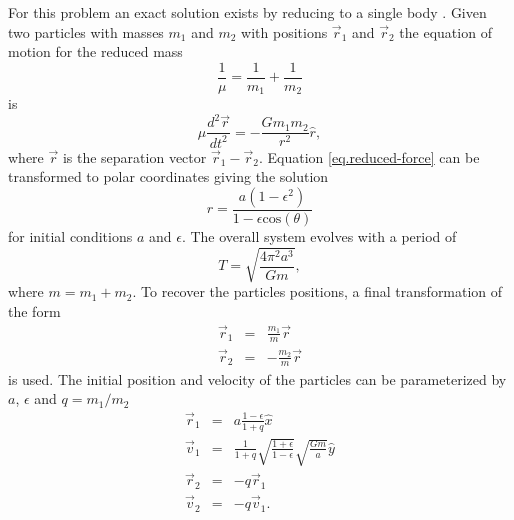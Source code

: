 For this problem an exact solution exists by reducing to a single body \citep{Landau1969}.
Given two particles with masses $m_1$ and $m_2$ with positions $\vec{r}_1$ and $\vec{r}_2$ the 
equation of motion for the reduced mass
\begin{equation}
	\frac{1}{\mu} = \frac{1}{m_1} + \frac{1}{m_2}
\end{equation}
is
\begin{equation}
	\mu\frac{d^2 \vec{r}}{dt^2} = -\frac{G m_1 m_2}{r^2}\hat{r},
    \label{eq.reduced-force}
\end{equation}
where $\vec{r}$ is the separation vector $\vec{r}_1 - \vec{r}_2$. Equation \ref{eq.reduced-force} 
can be transformed to polar coordinates giving the solution
\begin{equation}
	r = \frac{a(1-\epsilon^2)}{1-\epsilon \mathrm{cos}(\theta)}
\end{equation}
for initial conditions $a$ and $\epsilon$. The overall system evolves with a period of
\begin{equation}
    T = \sqrt{\frac{4\pi^2 a^3}{G m}},
\end{equation}
where $m=m_1 + m_2$. To recover the particles positions, a final transformation
of the form
\begin{equation}
	\begin{array}{rcl}
		\vec{r}_1 & = & \frac{m_1}{m}\vec{r}\\
    	\vec{r}_2 & = & -\frac{m_2}{m}\vec{r}
    \end{array}
\end{equation}
is used. The initial position and velocity of the particles can be parameterized by $a$,
$\epsilon$ and $q=m_1/m_2$
\begin{equation}
	\begin{array}{rcl}
    	\vec{r}_1 & = & a\frac{1-\epsilon}{1+q} \hat{x}\\
        \vec{v}_1 & = & \frac{1}{1+q}\sqrt{\frac{1+\epsilon}{1-\epsilon}}\sqrt{\frac{Gm}{a}} \hat{y}\\
        \vec{r}_2 & = & -q \vec{r}_1\\
        \vec{v}_2 & = & -q \vec{v}_1.
    \end{array}
\end{equation}

